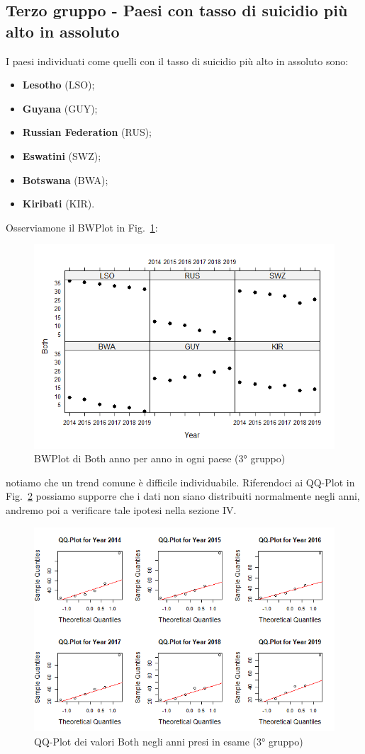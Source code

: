 \documentclass[conference]{IEEEtran}
\begin{document}
\subsection{Terzo gruppo - Paesi con tasso di suicidio più alto in assoluto}

I paesi individuati come quelli con il tasso di suicidio più alto
in assoluto sono:
\begin{itemize}
    \item \textbf{Lesotho} (LSO);
    \item \textbf{Guyana} (GUY);
    \item \textbf{Russian Federation} (RUS);
    \item \textbf{Eswatini} (SWZ);
    \item \textbf{Botswana} (BWA);
    \item \textbf{Kiribati} (KIR). 
\end{itemize}
Osserviamone il BWPlot in Fig.~\ref{9thridgroup}:
\begin{figure}[htbp]
    \centerline{\includegraphics[width=.5\textwidth]{img/9 - Thirdgroup.png}}
    \caption{BWPlot di Both anno per anno in ogni paese (3° gruppo)}
    \label{9thridgroup}
\end{figure}
notiamo che un trend comune è difficile individuabile.
Riferendoci ai QQ-Plot in Fig.~\ref{10thirdqq} possiamo supporre che i dati non siano
distribuiti normalmente negli anni, andremo poi a verificare tale ipotesi nella sezione IV.
\begin{figure}[htbp]
    \centerline{\includegraphics[width=.5\textwidth]{img/10 - Thirdqq.png}}
    \caption{QQ-Plot dei valori Both negli anni presi in esame (3° gruppo)}
    \label{10thirdqq}
\end{figure}
\end{document}

